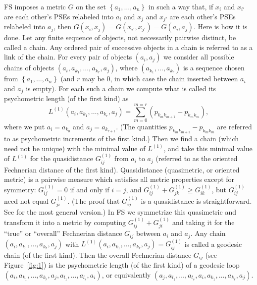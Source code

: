 \documentclass[nojss]{jss}
\begin{document}
FS imposes a metric $G$ on the set $\left\{ a_{1},\ldots,a_{n}\right\}$
in such a way that, if $x_{i}$ and $x_{i'}$ are each other's PSEs
relabeled into $a_{i}$ and $x_{j}$ and $x_{j'}$ are each other's
PSEs relabeled into $a_{j}$, then $G\left(x_{i},x_{j}\right)=G\left(x_{i'},x_{j'}\right)=G\left(a_{i},a_{j}\right)$.
Here is how it is done. Let any finite sequence of objects, not necessarily pairwise distinct, be called a chain. 
Any ordered pair of successive objects in a chain 
is referred to as a link of the chain.
For every pair of objects $\left(a_{i},a_{j}\right)$
we consider all possible chains of objects $\left(a_{i},a_{k_{1}},\ldots,a_{k_{r}},a_{j}\right)$,
where $\left(a_{k_{1}},\ldots,a_{k_{r}}\right)$ is a sequence chosen
from $\left\{ a_{1},\ldots,a_{n}\right\} $ (and $r$ may be $0$, in
which case the chain inserted between $a_{i}$ and $a_{j}$ is empty).
For each such a chain we compute what is called its psychometric length (of the first kind) as
\[
L^{(1)}\left(a_{i},a_{k_{1}},\ldots,a_{k_{r}},a_{j}\right)=\sum_{m=0}^{m=r}\left(p_{k_{m}k_{m+1}}-p_{k_{m}k_{m}}\right),
\]
where we put $a_{i}=a_{k_{0}}$ and $a_{j}=a_{k_{r+1}}$. (The quantities $p_{k_{m}k_{m+1}}-p_{k_{m}k_{m}}$
are referred to as psychometric increments of the first kind.)
Then we find a chain (which need not be unique) with the minimal value of
$L^{(1)}$, and take this minimal value of $L^{(1)}$ for the quasidistance
$G_{ij}^{(1)}$ from $a_{i}$ to $a_{j}$ (referred to as the oriented Fechnerian distance of the first kind). 
Quasidistance (quasimetric, or oriented metric) is a pairwise measure which satisfies all metric properties 
except for symmetry: $G_{ij}^{(1)}=0$ if and only if $i=j$,
and $G_{ij}^{(1)}+G_{jk}^{(1)}\geq G_{ik}^{(1)}$, but $G_{ij}^{(1)}$
need not equal $G_{ji}^{(1)}$. 
(The proof that $G_{ij}^{(1)}$ is a quasidistance is straightforward. See \cite{DzhCol2007}
for the most general version.) 
In FS we symmetrize this quasimetric and transform it into a metric by computing $G_{ij}^{(1)}+G_{ji}^{(1)}$
and taking it for the ``true'' or ``overall'' Fechnerian distance $G_{ij}$
between $a_{i}$ and $a_{j}$. Any chain $\left(a_{i},a_{k_{1}},\ldots,a_{k_{r}},a_{j}\right)$
with $L^{(1)}\left(a_{i},a_{k_{1}},\ldots,a_{k_{r}},a_{j}\right)=G_{ij}^{(1)}$
is called a geodesic chain (of the first kind). Then the overall Fechnerian distance $G_{ij}$ (see Figure~\ref{fig:1}) 
is the psychometric length (of the first kind) of a geodesic loop $\left(a_{i},a_{k_{1}},\ldots,a_{k_{r}},a_{j},a_{l_{1}},\ldots,a_{l_{s}},a_{i}\right)$,
or equivalently $\left(a_{j},a_{l_{1}},\ldots,a_{l_{s}},a_{i},a_{k_{1}},\ldots,a_{k_{r}},a_{j}\right)$.  
\end{document}
